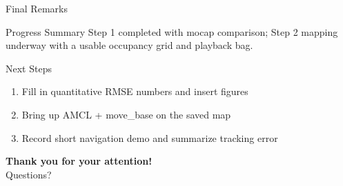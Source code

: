 \documentclass[10pt]{beamer}
\begin{document}
\begin{frame}{Final Remarks}
\begin{block}{Progress Summary}
Step 1 completed with mocap comparison; Step 2 mapping underway with a usable occupancy grid and playback bag.
\end{block}

\begin{block}{Next Steps}
\begin{enumerate}
    \item Fill in quantitative RMSE numbers and insert figures
    \item Bring up AMCL + move\_base on the saved map
    \item Record short navigation demo and summarize tracking error
\end{enumerate}
\end{block}

\begin{center}
\Large \textbf{Thank you for your attention!} \\
\vspace{0.5cm}
\normalsize Questions?
\end{center}
\end{frame}
\end{document}
